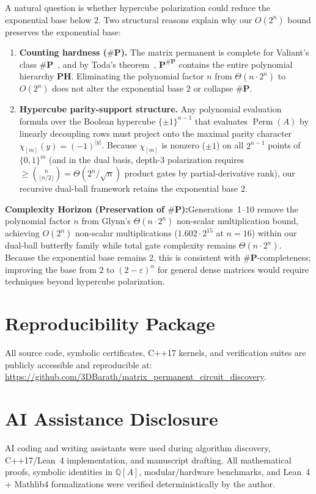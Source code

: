 \documentclass[11pt,a4paper]{article}
\newcommand{\Perm}{\operatorname{Perm}}
\newcommand{\wt}[1]{|#1|}
\newcommand{\takeaway}[2]{%
  \vspace{6pt}\noindent\colorbox{primary!8}{%
    \parbox{\dimexpr\linewidth-2\fboxsep\relax}{%
      \vspace{3pt}\textbf{\color{primary}#1:}\hspace{0.5em}#2\vspace{3pt}%
    }%
  }\vspace{6pt}%
}
\begin{document}
A natural question is whether hypercube polarization could reduce the exponential base below $2$. Two structural reasons explain why our $O(2^n)$ bound preserves the exponential base:

\begin{enumerate}[leftmargin=*]
    \item \textbf{Counting hardness ($\#\mathbf{P}$).} The matrix permanent is complete for Valiant's class $\#\mathbf{P}$~\cite{valiant1979}, and by Toda's theorem~\cite{toda1991}, $\mathbf{P}^{\#\mathbf{P}}$ contains the entire polynomial hierarchy $\mathbf{PH}$. Eliminating the polynomial factor $n$ from $\Theta(n \cdot 2^n)$ to $O(2^n)$ does not alter the exponential base $2$ or collapse $\#\mathbf{P}$.
    \item \textbf{Hypercube parity-support structure.} Any polynomial evaluation formula over the Boolean hypercube $\{\pm 1\}^{n-1}$ that evaluates $\Perm(A)$ by linearly decoupling rows must project onto the maximal parity character $\chi_{[m]}(y) = (-1)^{\wt{y}}$. Because $\chi_{[m]}$ is nonzero ($\pm 1$) on all $2^{n-1}$ points of $\{0,1\}^m$ (and in the dual basis, depth-3 polarization requires $\ge \binom{n}{\lfloor n/2 \rfloor} = \Theta(2^n/\sqrt{n})$ product gates by partial-derivative rank), our recursive dual-ball framework retains the exponential base $2$.
\end{enumerate}

\takeaway{Complexity Horizon (Preservation of $\#\mathbf{P}$)}{Generations~1--10 remove the polynomial factor $n$ from Glynn's $\Theta(n \cdot 2^n)$ non-scalar multiplication bound, achieving $O(2^n)$ non-scalar multiplications ($1.602 \cdot 2^{15}$ at $n = 16$) within our dual-ball butterfly family while total gate complexity remains $\Theta(n \cdot 2^n)$. Because the exponential base remains $2$, this is consistent with $\#\mathbf{P}$-completeness; improving the base from $2$ to $(2 - \varepsilon)^n$ for general dense matrices would require techniques beyond hypercube polarization.}

\section*{Reproducibility Package}
All source code, symbolic certificates, C++17 kernels, and verification suites are publicly accessible and reproducible at: \\
\url{https://github.com/3DBarath/matrix_permanent_circuit_discovery}.

\section*{AI Assistance Disclosure}
AI coding and writing assistants were used during algorithm discovery, C++17/Lean~4 implementation, and manuscript drafting. All mathematical proofs, symbolic identities in $\mathbb{Q}[A]$, modular/hardware benchmarks, and Lean~4 + Mathlib4 formalizations were verified deterministically by the author.
\end{document}
